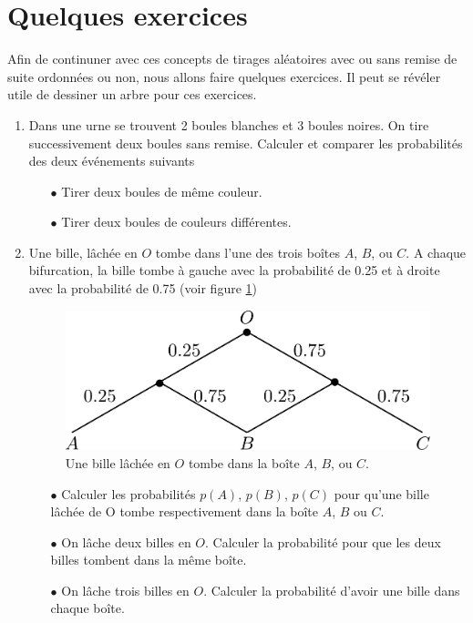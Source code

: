 \documentclass[a4paper,12pt]{book}
\begin{document}
\section{Quelques exercices}
Afin de continuner avec ces concepts de tirages aléatoires avec ou sans remise
de suite ordonnées ou non, nous allons faire quelques exercices. Il peut se révéler utile de dessiner un arbre pour ces exercices.
\begin{enumerate}
 \item Dans une urne se trouvent 2 boules blanches et 3 boules noires. On tire successivement deux boules sans remise.
Calculer et comparer les probabilités des deux événements suivants
\begin{itemize}
 \item[$\bullet$] Tirer deux boules de même couleur.
 \item[$\bullet$] Tirer deux boules de couleurs différentes.
\end{itemize}
\item Une bille, lâchée en $O$ tombe dans l'une des trois boîtes $A$, $B$, ou $C$. A chaque bifurcation, la bille 
tombe à gauche avec la probabilité de 0.25 et à droite avec la probabilité de 0.75 (voir figure \ref{fig_bille})
\begin{figure}[htp]
\begin{center}
\includegraphics[height=2.8truecm]{figs/bille.pdf}
\end{center}
\caption{Une bille lâchée en $O$ tombe dans la boîte $A$, $B$, ou $C$.}\label{fig_bille}
\end{figure}
\begin{itemize}
 \item[$\bullet$] Calculer les probabilités $p(A)$, $p(B)$, $p(C)$ pour qu'une bille lâchée de O tombe respectivement 
dans la boîte $A$, $B$ ou $C$.
\item[$\bullet$] On lâche deux billes en $O$. Calculer la probabilité pour que les deux billes tombent dans la même boîte.
\item[$\bullet$] On lâche trois billes en $O$. Calculer la probabilité d'avoir une bille dans chaque boîte.

\end{itemize}
\end{enumerate}
\end{document}
